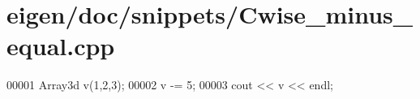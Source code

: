 \hypertarget{eigen_2doc_2snippets_2_cwise__minus__equal_8cpp_source}{}\section{eigen/doc/snippets/\+Cwise\+\_\+minus\+\_\+equal.cpp}
\label{eigen_2doc_2snippets_2_cwise__minus__equal_8cpp_source}

\begin{DoxyCode}
00001 Array3d v(1,2,3);
00002 v -= 5;
00003 cout << v << endl;
\end{DoxyCode}
